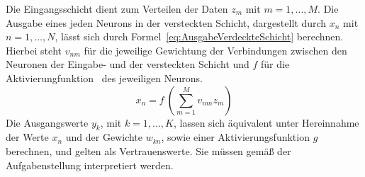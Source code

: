 \documentclass[times, 11pt,twocolumn]{article}
\begin{document}
Die Eingangsschicht dient zum Verteilen der Daten $z_m$ mit $m=1,...,M$. Die Ausgabe eines jeden Neurons in der versteckten Schicht, dargestellt durch $x_n$ mit $n=1,...,N$, lässt sich durch Formel~\ref{eq:AusgabeVerdeckteSchicht} berechnen. Hierbei steht $v_{nm}$ für die jeweilige Gewichtung der Verbindungen zwischen den Neuronen der Eingabe- und der versteckten Schicht und $f$ für die Aktivierungfunktion~\cite{NNStanley}\cite{NNHaykin} des jeweiligen Neurons. 
\footnotesize
\begin{equation} 
x_n = f~(\sum_{m=1}^M v_{nm}z_m)
	\label{eq:AusgabeVerdeckteSchicht}
\end{equation}
\small
Die Ausgangswerte $y_k$, mit $k=1,...,K$, lassen sich äquivalent unter Hereinnahme der Werte $x_n$ und der Gewichte $w_{kn}$, sowie einer Aktivierungsfunktion $g$ berechnen, und gelten als Vertrauenswerte. Sie müssen gemäß der Aufgabenstellung interpretiert werden. 
\end{document}

